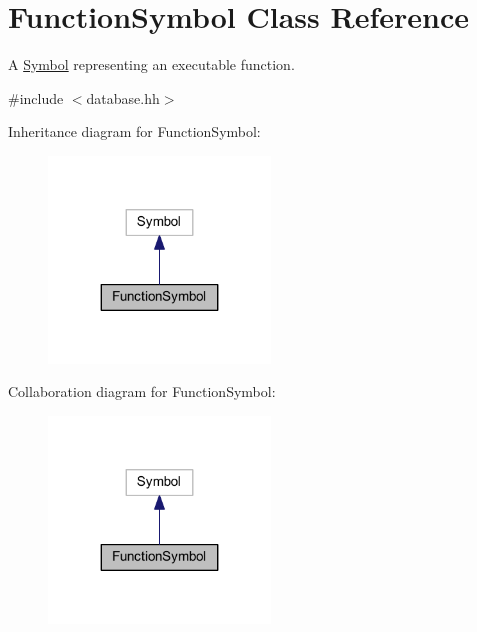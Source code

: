 \hypertarget{class_function_symbol}{}\section{Function\+Symbol Class Reference}
\label{class_function_symbol}


A \mbox{\hyperlink{class_symbol}{Symbol}} representing an executable function.  




{\ttfamily \#include $<$database.\+hh$>$}



Inheritance diagram for Function\+Symbol\+:
\nopagebreak
\begin{figure}[H]
\begin{center}
\leavevmode
\includegraphics[width=167pt]{class_function_symbol__inherit__graph}
\end{center}
\end{figure}


Collaboration diagram for Function\+Symbol\+:
\nopagebreak
\begin{figure}[H]
\begin{center}
\leavevmode
\includegraphics[width=167pt]{class_function_symbol__coll__graph}
\end{center}
\end{figure}
